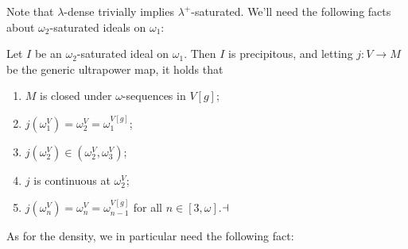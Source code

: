 \documentclass[../main]{subfiles}
\begin{document}
Note that $\lambda$-dense trivially implies
$\lambda^+$-saturated. We'll need the following facts about
$\omega_2$-saturated ideals on $\omega_1$:

\begin{proposition}
  \label{prop.ideal}
  Let $I$ be an $\omega_2$-saturated ideal on $\omega_1$. Then $I$ is
  precipitous, and letting $j \colon V\to M$ be the generic ultrapower map,
  it holds that
  \begin{enumerate}
    \item $M$ is closed under $\omega$-sequences in $V[g]$;
    \item $j(\omega_1^V)=\omega_2^V=\omega_1^{V[g]}$;
    \item $j(\omega_2^V)\in(\omega_2^V,\omega_3^V)$;
    \item $j$ is continuous at $\omega_2^V$;
    \item $j(\omega_n^V)=\omega_n^V=\omega_{n-1}^{V[g]}$ for all
      $n\in[3,\omega]$.$\hfill\dashv$
  \end{enumerate}
\end{proposition}

As for the density, we in particular need the following fact:


\end{document}
